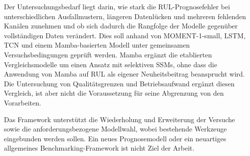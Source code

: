 Der Untersuchungsbedarf liegt darin, wie stark die \ac{RUL}-Prognosefehler bei unterschiedlichen Ausfallmustern, längeren Datenlücken und mehreren fehlenden Kanälen zunehmen und ob sich dadurch die Rangfolge der Modelle gegenüber vollständigen Daten verändert. Dies soll anhand von MOMENT-1-small, \ac{LSTM}, \ac{TCN} und einem Mamba-basierten Modell unter gemeinsamen Versuchsbedingungen geprüft werden. Mamba ergänzt die etablierten Vergleichsmodelle um einen Ansatz mit selektiven \acp{SSM}, ohne dass die Anwendung von Mamba auf \ac{RUL} als eigener Neuheitsbeitrag beansprucht wird. Die Untersuchung von Qualitätsgrenzen und Betriebsaufwand ergänzt diesen Vergleich, ist aber nicht die Voraussetzung für seine Abgrenzung von den Vorarbeiten.

Das Framework unterstützt die Wiederholung und Erweiterung der Versuche sowie die anforderungsbezogene Modellwahl, wobei bestehende Werkzeuge eingebunden werden sollen. Ein neues Prognosemodell oder ein neuartiges allgemeines Benchmarking-Framework ist nicht Ziel der Arbeit.


